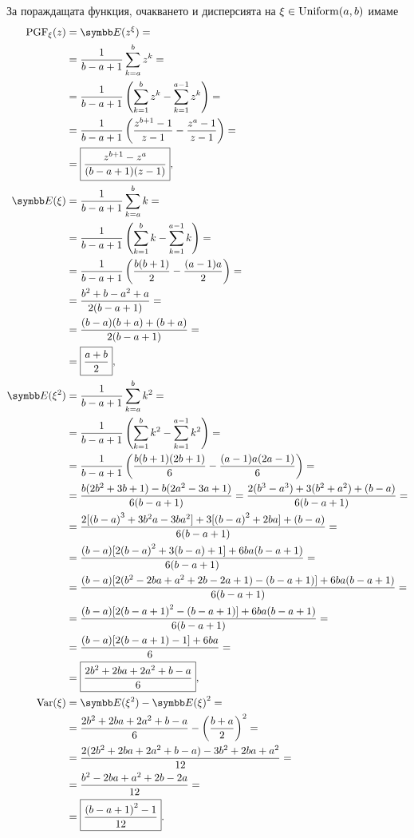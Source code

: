 \documentclass[numbers=endperiod, bibliography=totocnumbered]{scrartcl}
\begin{document}
За пораждащата функция, очакването и дисперсията на \( \xi \in \operatorname{Uniform}(a, b) \) имаме
\begingroup
\allowdisplaybreaks
\begin{align*}
  \PGF_\xi(z)
  &=
  \Expect(z^\xi)
  = \\ &=
  \frac 1 {b-a+1} \sum_{k=a}^b z^k
  = \\ &=
  \frac 1 {b-a+1} \left( \sum_{k=1}^b z^k - \sum_{k=1}^{a-1} z^k \right)
  = \\ &=
  \frac 1 {b-a+1} \left(\frac {z^{b+1} - 1} {z - 1} - \frac {z^a - 1} {z - 1} \right)
  = \\ &=
  \boxed{\frac {z^{b+1} - z^a} {(b-a+1)(z-1)}},
  \\
  \Expect(\xi)
  &=
  \frac 1 {b-a+1} \sum_{k=a}^b k
  = \\ &=
  \frac 1 {b-a+1} \left( \sum_{k=1}^b k - \sum_{k=1}^{a-1} k \right)
  = \\ &=
  \frac 1 {b-a+1} \left( \frac {b(b+1)} 2 - \frac {(a-1)a} 2 \right)
  = \\ &=
  \frac {b^2 + b - a^2 + a} {2(b-a+1)}
  = \\ &=
  \frac {(b-a)(b+a) + (b+a)} {2(b-a+1)}
  = \\ &=
  \boxed{\frac {a+b} 2},
  \\
  \Expect(\xi^2)
  &=
  \frac 1 {b-a+1} \sum_{k=a}^b k^2
  = \\ &=
  \frac 1 {b-a+1} \left( \sum_{k=1}^b k^2 - \sum_{k=1}^{a-1} k^2 \right)
  = \\ &=
  \frac 1 {b-a+1} \left( \frac {b(b+1)(2b+1)} 6 - \frac {(a-1)a(2a-1)} 6 \right)
  = \\ &=
  \frac {b(2b^2 + 3b + 1) - b(2a^2 - 3a + 1)} {6(b-a+1)}
  =
  \frac {2(b^3 - a^3) + 3(b^2 + a^2) + (b-a)} {6(b-a+1)}
  = \\ &=
  \frac {2[{(b-a)}^3 + 3b^2a - 3ba^2] + 3[{(b-a)}^2 + 2ba] + (b-a)} {6(b-a+1)}
  = \\ &=
  \frac {(b-a) [2{(b-a)}^2 + 3(b-a) + 1] + 6ba(b-a+1)} {6(b-a+1)}
  = \\ &=
  \frac {(b-a) [2(b^2 - 2ba + a^2 + 2b - 2a + 1) - (b-a+1)] + 6ba(b-a+1)} {6(b-a+1)}
  = \\ &=
  \frac {(b-a) [2{(b-a+1)}^2 - (b-a+1)] + 6ba(b-a+1)} {6(b-a+1)}
  = \\ &=
  \frac {(b-a) [2(b-a+1)-1] + 6ba} 6
  = \\ &=
  \boxed{\frac {2b^2+2ba+2a^2+b-a} 6},
  \\
  \Var(\xi)
  &=
  \Expect(\xi^2) - {\Expect(\xi)}^2
  = \\ &=
  \frac {2b^2+2ba+2a^2+b-a} 6 - {\left( \frac {b+a} 2 \right)}^2
  = \\ &=
  \frac {2(2b^2+2ba+2a^2+b-a) - 3{b^2+2ba+a^2}} {12}
  = \\ &=
  \frac {b^2-2ba+a^2+2b-2a} {12}
  = \\ &=
  \boxed{\frac {{(b-a+1)}^2-1} {12}}.
\end{align*}
\endgroup
\end{document}
